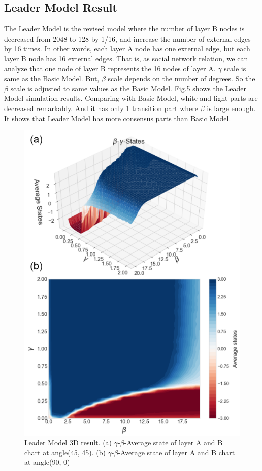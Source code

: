 \documentclass[english]{cccconf}
\begin{document}
\subsection{Leader Model Result}
The Leader Model is the revised model where the number of layer B nodes is decreased from 2048 to 128 by 1/16, and increase the number of external edges by 16 times. In other words, each layer A node has one external edge, but each layer B node has 16 external edges. That is, as social network relation, we can analyze that one node of layer B represents the 16 nodes of layer A. $\gamma$ scale is same as the Basic Model. But, $\beta$ scale depends on the number of degrees. So the $\beta$ scale is adjusted to same values as the Basic Model. Fig.5 shows the Leader Model simulation results. Comparing with Basic Model, white and light parts are decreased remarkably. And it has only 1 transition part where $\beta$ is large enough. It shows that Leader Model has more consensus parts than Basic Model.
\begin{figure}[!htb]
  \centering
  \includegraphics[width=\hsize]{FIG5.png}
  \caption{Leader Model 3D result. (a) $\gamma$-$\beta$-Average state of layer A and B chart at angle(45, 45). (b) $\gamma$-$\beta$-Average state of layer A and B chart at angle(90, 0)}
  \label{Fig5}
\end{figure}
\end{document}
